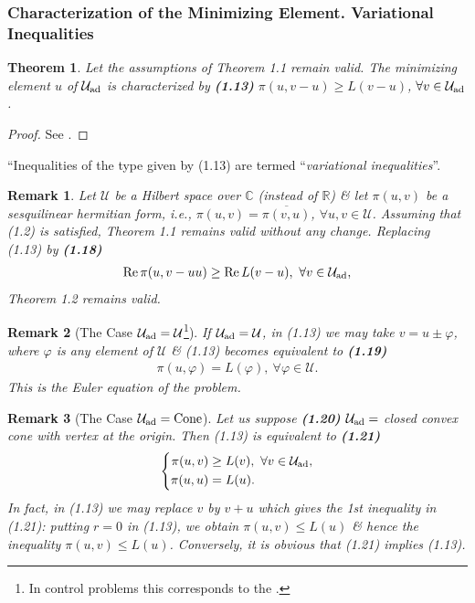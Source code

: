 \documentclass[oneside]{book}
\numberwithin{equation}{section}
\newtheorem{remark}{Remark}[chapter]
\newtheorem{theorem}{Theorem}[chapter]
\begin{document}
\subsubsection{Characterization of the Minimizing Element. Variational Inequalities}
\begin{theorem}
	Let the assumptions of Theorem 1.1 remain valid. The minimizing element $u$ of $\mathcal{U}_{\rm ad}$ is characterized by \textbf{(1.13)} $\pi(u,v - u)\ge L(v - u)$, $\forall v\in\mathcal{U}_{\rm ad}$.
\end{theorem}

\begin{proof}
	See \cite[p. 9]{Lions1971}.
\end{proof}
``Inequalities of the type given by (1.13) are termed ``\textit{variational inequalities}''.

\begin{remark}
	Let $\mathcal{U}$ be a Hilbert space over $\mathbb{C}$ (instead of $\mathbb{R}$) \& let $\pi(u,v)$ be a sesquilinear hermitian form, i.e., $\pi(u,v) = \overline{\pi(v,u)}$, $\forall u,v\in\mathcal{U}$. Assuming that (1.2) is satisfied, Theorem 1.1 remains valid without any change. Replacing (1.13) by \textbf{(1.18)}
	\begin{align*}
		\operatorname{Re}\pi(u,v - uu)\ge\operatorname{Re}L(v - u),\ \forall v\in\mathcal{U}_{\rm ad},
	\end{align*}
	Theorem 1.2 remains valid.
\end{remark}

\begin{remark}[The Case $\mathcal{U}_{\rm ad} = \mathcal{U}$\footnote{In control problems this corresponds to the .}]
	If $\mathcal{U}_{\rm ad} = \mathcal{U}$, in (1.13) we may take $v = u\pm\varphi$, where $\varphi$ is any element of $\mathcal{U}$ \& (1.13) becomes equivalent to \textbf{(1.19)}
	\begin{align*}
		\pi(u,\varphi) = L(\varphi),\ \forall\varphi\in\mathcal{U}.
	\end{align*}
	This is the \emph{Euler equation} of the problem.
\end{remark}

\begin{remark}[The Case $\mathcal{U}_{\rm ad} = \mbox{Cone}$]
	Let us suppose \textbf{(1.20)} $\mathcal{U}_{\rm ad} =$ closed convex cone with vertex at the origin. Then (1.13) is equivalent to \textbf{(1.21)}
	\begin{equation*}
		\left\{\begin{split}
			\pi(u,v)&\ge L(v),\ \forall v\in\mathcal{U}_{\rm ad},\\
			\pi(u,u) &= L(u).
		\end{split}\right.
	\end{equation*}
	In fact, in (1.13) we may replace $v$ by $v + u$ which gives the 1st inequality in (1.21): putting $r = 0$ in (1.13), we obtain $\pi(u,v)\le L(u)$ \& hence the inequality $\pi(u,v)\le L(u)$. Conversely, it is obvious that (1.21) implies (1.13).
\end{remark}
\end{document}
